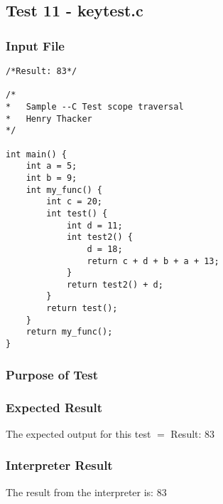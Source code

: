 \subsection{Test 11 - keytest.c}
\subsubsection{Input File}
\begin{lstlisting}[showstringspaces=false,breaklines=true,backgroundcolor=\color{light-gray}, captionpos=b]
/*Result: 83*/

/*
*	Sample --C Test scope traversal
*	Henry Thacker
*/

int main() {
	int a = 5;
	int b = 9;
	int my_func() {
		int c = 20;		
		int test() {
			int d = 11;
			int test2() {  
				d = 18;
				return c + d + b + a + 13;
			}
			return test2() + d;
		}
		return test();
	}
	return my_func();
}
\end{lstlisting}\subsubsection{Purpose of Test}

\subsubsection{Expected Result}
The expected output for this test $=$ Result: 83
\subsubsection{Interpreter Result}
The result from the interpreter is: 83
